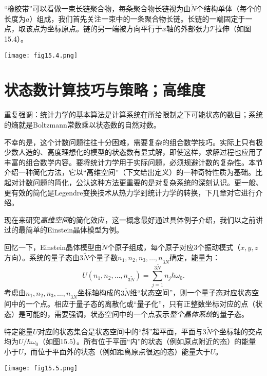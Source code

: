 “橡胶带”可以看做一束长链聚合物，每条聚合物长链视为由$\tilde{N}$个结构单体（每个的长度为$a$）组成，我们首先关注一束中的一条聚合物长链。长链的一端固定于一点，取该点为坐标原点。链的另一端被方向平行于$x$轴的外部张力$\mathscr{T}$拉伸（如图15.4）。

{
	\centering
	\texttt{[image: fig15.4.png]}
	\label{fig15.4}
}

\section{状态数计算技巧与策略；高维度}
\label{sec15.5}
重复强调：统计力学的基本算法是计算系统在所给限制之下可能状态的数目；系统的熵就是Boltzmann常数乘以状态数的自然对数。

不幸的是，这个计数问题往往十分困难，需要复杂的组合数学技巧。实际上只有极少数人造的、高度理想化的模型的状态数有显式解，即使这样，求解过程也应用了丰富的组合数学内容。要将统计力学用于实际问题，必须规避计数的复杂性。本节介绍一种简化方法，它以“高维空间”（下文给出定义）的一种奇特性质为基础。比起对计数问题的简化，公认这种方法更重要的是对复杂系统的深刻认识。更一般、更有效的简化是Legendre变换技术从热力学到统计力学的转换，下几章对它进行介绍。

现在来研究{\it 高维空间}的简化效应，这一概念最好通过具体例子介绍，我们以之前讲过的最简单的Einstein晶体模型为例。

回忆一下，Einstein晶体模型由$\tilde{N}$个原子组成，每个原子对应3个振动模式（$x, y, z$方向）。系统的量子态由$3 \tilde{N}$个量子数$n_1, n_2, n_3, \dots, n_{3 \tilde{N}}$确定，能量为：
\begin{equation}
	U(n_1, n_2, \dots, n_{3 \tilde{N}}) = \sum_{j = 1}^{3 \tilde{N}} n_j \hbar \omega_0.
\label{equ15.28}
\end{equation}
考虑由$n_1, n_2, n_3, \dots, n_{3 \tilde{N}}$坐标轴构成的$3 \tilde{N}$维“状态空间”，则一个量子态对应状态空间中的一个点。相应于量子态的离散化或“量子化”，只有正整数坐标对应的点（状态）是可能的，需要强调，状态空间中的一个点表示{\it 整个晶体系统}的量子态。

特定能量$U$对应的状态集合是状态空间中的“斜”超平面，平面与$3 \tilde{N}$个坐标轴的交点均为$U/\hbar \omega_0$（如图15.5）。所有位于平面“内”的状态（例如原点附近的态）的能量小于$U$，而位于平面外的状态（例如距离原点很远的态）能量大于$U$。

{
	\centering
	\texttt{[image: fig15.5.png]}
	\label{fig15.5}
}

